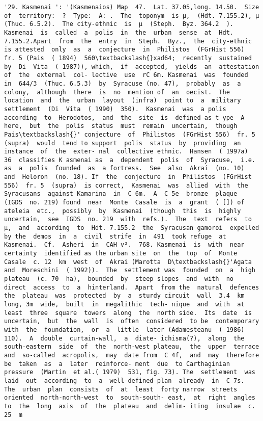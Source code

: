 \documentclass[11pt]{article}
\begin{document}
\begin{Verbatim}[commandchars=\\\{\}]
         '29. Kasmenai ': '(Kasmenaios) Map  47.  Lat. 37.05,long. 14.50.  Size  of  territory:  ?  Type:  A: .  The  toponym  is µ,  (Hdt. 7.155.2), µ  (Thuc. 6.5.2).  The city-ethnic  is  µ  (Steph.  Byz. 364.2  ). Kasmenai  is  called  a  polis  in  the  urban  sense  at  Hdt. 7.155.2.Apart  from  the  entry  in  Steph.  Byz.,  the  city-ethnic  is attested  only  as  a  conjecture  in  Philistos  (FGrHist 556)  fr. 5 (Pais  ( 1894)  560\textbackslash{}xad64;  recently  sustained  by  Di  Vita  ( 1987)), which,  if  accepted,  yields  an  attestation  of  the  external  col- lective  use  rC 6m. Kasmenai  was  founded  in  644/3  (Thuc. 6.5.3)  by  Syracuse (no. 47),  probably  as  a  colony,  although  there  is  no  mention of  an  oecist.  The  location  and  the  urban  layout  (infra)  point to  a  military  settlement  (Di  Vita  ( 1990)  350).  Kasmenai  was  a polis  according  to  Herodotos,  and  the  site  is  defined as t ype  A here,  but  the  polis  status  must  remain  uncertain,  though  Pais\textbackslash{}' conjecture  of  Philistos  (FGrHist 556)  fr. 5  (supra)  would  tend to support  polis  status  by  providing  an  instance  of  the  exter- nal  collective ethnic.  Hansen  ( 1997a)  36  classifies K asmenai as  a  dependent  polis  of  Syracuse,  i.e.  as  a  polis  founded  as  a fortress.  See  also  Akrai  (no. 10)  and  Heloron  (no. 18). If  the  conjecture  in  Philistos  (FGrHist 556)  fr. 5  (supra)  is correct,  Kasmenai  was  allied  with  the  Syracusans  against Kamarina  in  C 6m.  A  C 5e  bronze  plaque  (IGDS  no. 219) found  near  Monte  Casale  is  a  grant  ( []) of ateleia  etc.,  possibly  by  Kasmenai  (though  this  is  highly uncertain,  see  IGDS  no. 219  with  refs.).  The  text  refers  to µ,  and  according  to  Hdt. 7.155.2  the  Syracusan gamoroi  expelled  by the  demos  in  a  civil  strife  in  491  took refuge  at  Kasmenai.  Cf.  Asheri  in  CAH v².  768. Kasmenai  is  with  near  certainty  identified as the urban site  on  the  top  of  Monte  Casale  c. 12  km  west  of  Akrai (Marotta  D\textbackslash{}'Agata  and  Moreschini  ( 1992)).  The  settlement was  founded  on  a  high  plateau  (c. 70  ha),  bounded  by  steep slopes  and  with  no  direct  access  to  a  hinterland.  Apart  from the  natural  defences  the  plateau  was  protected  by  a  sturdy circuit  wall  3.4  km  long, 3m  wide,  built  in  megalithic  tech- nique  and  with  at  least  three  square  towers  along  the  north side.  Its  date  is  uncertain,  but  the  wall  is  often  considered  to be  contemporary  with  the  foundation,  or  a  little  later (Adamesteanu  ( 1986)  110).  A  double  curtain-wall,  a  diate- ichisma(?),  along  the  south-eastern  side  of  the  north-west plateau,  the  upper  terrace  and  so-called  acropolis,  may  date from  C 4f,  and  may  therefore  be  taken  as  a  later  reinforce- ment  due  to Carthaginian  pressure  (Martin  et al.( 1979)  531, fig. 73). The  settlement  was  laid  out  according  to  a  well-defined plan  already  in  C 7s.  The  urban  plan  consists  of  at  least  forty narrow  streets  oriented  north-north-west  to  south-south- east,  at  right  angles  to  the  long  axis  of  the  plateau  and  delim- iting  insulae  c. 25  m  
\end{Verbatim}
\end{document}
